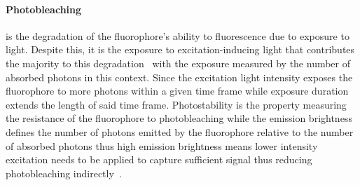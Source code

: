 \paragraph{Photobleaching} is the degradation of the fluorophore's ability to fluorescence due to exposure to light\cite{photobleach_excite, photobleachingPaper}. Despite this, it is the exposure to excitation-inducing light that contributes the majority to this degradation~\cite{photobleach_excite} with the exposure measured by the number of absorbed photons in this context. Since the excitation light intensity exposes the fluorophore to more photons within a given time frame while exposure duration extends the length of said time frame. Photostability is the property measuring the resistance of the fluorophore to photobleaching while the emission brightness defines the number of photons emitted by the fluorophore relative to the number of absorbed photons thus high emission brightness means lower intensity excitation needs to be applied to capture sufficient signal thus reducing photobleaching indirectly~\cite{Sanderson-2014}.

